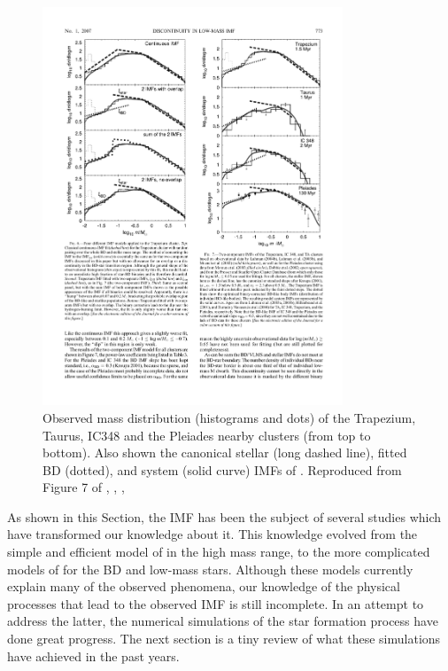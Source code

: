  \begin{figure}[htbp]
\begin{center}
\includegraphics[width=0.8\textwidth]{background/Figures/F7_Thies2007.pdf}
\caption{Observed mass distribution (histograms and dots) of the Trapezium, Taurus, IC348 and the Pleiades nearby clusters (from top to bottom). Also shown the canonical stellar (long dashed line), fitted BD (dotted), and system (solid curve) IMFs of \citet{Thies2007} . Reproduced from Figure 7 of \citet{Thies2007}, \textit{}, , }
\label{fig:IMFThies2007}
\end{center}
\end{figure}
 
As shown in this Section, the IMF has been the subject of several studies which have transformed our knowledge about it. This knowledge evolved from the simple and efficient model of \citet{Salpeter1955} in the high mass range, to the more complicated models of \citet{Thies2007, 2013pss5.book..115K} for the BD and low-mass stars. Although these models currently explain many of the observed phenomena, our knowledge of the physical processes that lead to the observed IMF is still incomplete. In an attempt to address the latter, the numerical simulations of the star formation process have done great progress. The next section is a tiny review of what these simulations have achieved in the past years.


